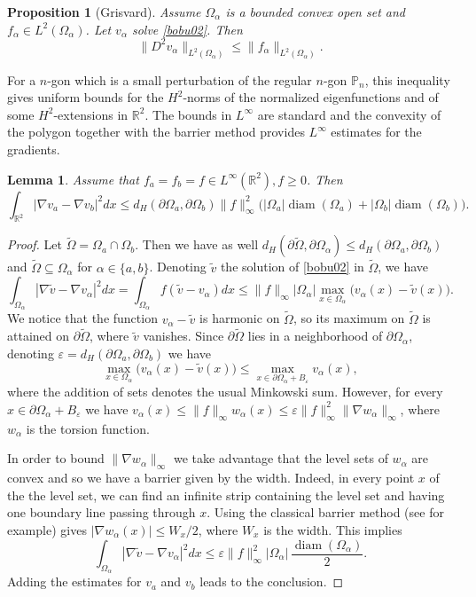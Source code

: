 \documentclass[11pt]{article}
\numberwithin{equation}{section}\newtheorem*{jepEnonce}{\jepEnonceTitle}\newenvironment{enonce*}[1]{\def\jepEnonceTitle{#1}\jepEnonce}{\endjepEnonce}\newtheorem*{conj*}{Conjecture}
\theoremstyle{plain}
\newtheorem{lemma}[thm]{Lemma}
\newtheorem{propo}[thm]{Proposition}
\theoremstyle{definition}
\newcommand{\diam}{\operatorname{diam}}
\def\R{\mathbb{R}}
\newcommand{\vps}{\varepsilon}
\newcommand{\Om}{\Omega}
\newcommand{\sq}{\subseteq}
\begin{document}
\begin{propo}[Grisvard]
Assume $\Om_\alpha$ is a bounded convex open set and $f_\alpha \in L^2(\Om_\alpha)$.
Let $v_\alpha$ solve \eqref{bobu02}. Then
\[
\|D^2 v_\alpha\|_{L^2(\Om_\alpha)} \le \|f_\alpha\|_{L^2(\Om_\alpha)}.
\]
\end{propo}
For a $n$-gon which is a small perturbation of the regular $n$-gon $\mathbb P_n$, this inequality gives uniform bounds for the $H^2$-norms of the normalized eigenfunctions and of some $H^2$\nobreakdash-extensions in $\R^2$. The bounds in $L^\infty$ are standard and the convexity of the polygon together with the barrier method provides $L^\infty$ estimates for the gradients.

\begin{lemma}\label{bb05}
Assume that $f_a=f_b= f \in L^\infty (\R^2), f \ge 0$. Then
\begin{equation}\label{bb05.1}
\int_{\R^2} |\nabla v_{a}-\nabla v_b |^2 dx\le d_H(\partial \Om_{a}, \partial \Om_{b}) \|f\|_\infty^2 \Big (|\Om_a|\diam (\Om_a) +|\Om_b|\diam (\Om_b)\Big).
\end{equation}
\end{lemma}
\begin{proof}
Let $\tilde \Om =\Om_a \cap \Om_b$. Then we have as well $d_H(\partial \tilde \Om, \partial \Om_\alpha) \le d_H(\partial \Om_{a}, \partial \Om_{b}) $ and $\tilde \Om \sq \Om_\alpha$ for $\alpha\in \{a,b\}$. Denoting $\tilde v$ the solution of \eqref{bobu02} in $\tilde \Om$, we have
\[
\int_{\Om_\alpha} |\nabla \tilde v -\nabla v_\alpha |^2 dx= \int_{\Om_\alpha} f(\tilde v-v_\alpha) dx\le\|f\|_\infty |\Om_\alpha| \max_{x \in\Om_\alpha} \big (v_\alpha(x)-\tilde v (x)\big).
\]
We notice that the function $v_\alpha -\tilde v$ is harmonic on $\tilde \Om$, so its maximum on $\tilde \Om$ is attained on $\partial \tilde \Om$, where $\tilde v$ vanishes. Since $\partial \tilde \Om$ lies in a neighborhood of $\partial \Om_\alpha$, denoting $\vps = d_H(\partial \Om_{a}, \partial \Om_{b})$ we have
\[
\max_{x \in\Om_\alpha } \big (v_\alpha(x)-\tilde v (x) \big) \le \max_{x \in \partial \Om_\alpha + B_\vps}v_\alpha(x),
\]
where the addition of sets denotes the usual Minkowski sum.
However, for every $x \in \partial \Om_\alpha + B_\vps$ we have $v_\alpha(x)\le \|f\|_\infty w_\alpha(x)\le \vps \|f\|_\infty^2 \|\nabla w_\alpha \|_\infty$, where $w_\alpha$ is the torsion function.

In order to bound $\|\nabla w_\alpha \|_\infty$ we take advantage that the level sets of $w_\alpha$ are convex and so we have a barrier given by the width. Indeed, in every point $x$ of the the level set, we can find an infinite strip containing the level set and having one boundary line passing through $x$. Using the classical barrier method (see \cite{Tr72} for example) gives $ |\nabla w_{\alpha}(x)| \le W_x/2$, where $W_x$ is the width. This implies
\[
\int_{\Om_\alpha} |\nabla \tilde v-\nabla v_\alpha |^2 dx \le \vps \|f\|_\infty^2 |\Om_\alpha| \,\frac{\diam (\Om_\alpha)}{ 2}.
\]
Adding the estimates for $v_a$ and $v_b$ leads to the conclusion.
\end{proof}
\end{document}
